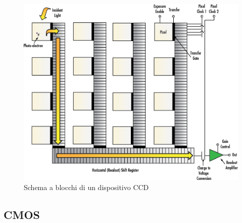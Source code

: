 \begin{figure}[!ht]
\centering

\includegraphics[width=\textwidth]{img/ccd-blockdiagram.jpeg}

\caption{Schema a blocchi di un dispositivo CCD}
\label{fig:ccd-blockdiagram}
\end{figure}

\subsection{CMOS}


